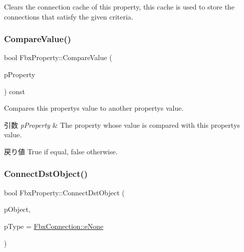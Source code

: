 Clears the connection cache of this property, this cache is used to store the connections that satisfy the given criteria. 

\mbox{\label{class_fbx_property_a41408b250f8d1f15baa0aa358a7cc163}} 
\subsubsection{\texorpdfstring{Compare\+Value()}{CompareValue()}}
{\footnotesize\ttfamily bool Fbx\+Property\+::\+Compare\+Value (\begin{DoxyParamCaption}\item[{const \hyperlink{class_fbx_property}{Fbx\+Property} \&}]{p\+Property }\end{DoxyParamCaption}) const}

Compares this property\textquotesingle{}s value to another property\textquotesingle{}s value. 
\begin{DoxyParams}{引数}
{\em p\+Property} & The property whose value is compared with this property\textquotesingle{}s value. \\
\hline
\end{DoxyParams}
\begin{DoxyReturn}{戻り値}
{\ttfamily True} if equal, {\ttfamily false} otherwise. 
\end{DoxyReturn}
\mbox{\label{class_fbx_property_aa6ba6b487c09e1cecc2eb02440998d1a}} 
\subsubsection{\texorpdfstring{Connect\+Dst\+Object()}{ConnectDstObject()}}
{\footnotesize\ttfamily bool Fbx\+Property\+::\+Connect\+Dst\+Object (\begin{DoxyParamCaption}\item[{\hyperlink{class_fbx_object}{Fbx\+Object} $\ast$}]{p\+Object,  }\item[{\hyperlink{class_fbx_connection_a3df448a5db356652ab99fd2be2553749}{Fbx\+Connection\+::\+E\+Type}}]{p\+Type = {\ttfamily \hyperlink{class_fbx_connection_a3df448a5db356652ab99fd2be2553749a47aa04870c3c0769263e3972e67e9ebe}{Fbx\+Connection\+::e\+None}} }\end{DoxyParamCaption})}

